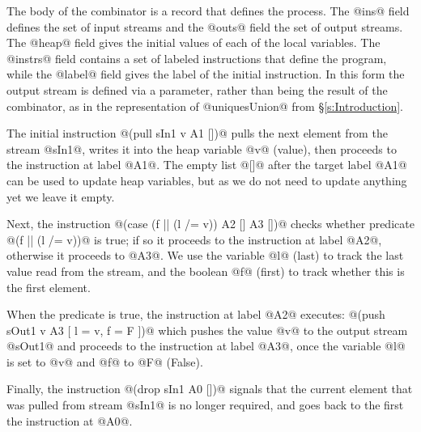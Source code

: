 The body of the combinator is a record that defines the process. The @ins@ field defines the set of input streams and the @outs@ field the set of output streams. The @heap@ field gives the initial values of each of the local variables. The @instrs@ field contains a set of labeled instructions that define the program, while the @label@ field gives the label of the initial instruction. In this form the output stream is defined via a parameter, rather than being the result of the combinator, as in the representation of @uniquesUnion@ from \S\ref{s:Introduction}. 

The initial instruction @(pull sIn1 v A1 [])@ pulls the next element from the stream @sIn1@, writes it into the heap variable @v@ (value), then proceeds to the instruction at label @A1@. The empty list @[]@ after the target label @A1@ can be used to update heap variables, but as we do not need to update anything yet we leave it empty. 

Next, the instruction @(case (f || (l /= v)) A2 [] A3 [])@ checks whether predicate @(f || (l /= v))@ is true; if so it proceeds to the instruction at label @A2@, otherwise it proceeds to @A3@. We use the variable @l@ (last) to track the last value read from the stream, and the boolean @f@ (first) to track whether this is the first element.

When the predicate is true, the instruction at label @A2@ executes:
@(push sOut1 v A3 [ l = v, f = F ])@
which pushes the value @v@ to the output stream @sOut1@ and proceeds to the instruction at label @A3@, once the variable @l@ is set to @v@ and @f@ to @F@ (False).

Finally, the instruction @(drop sIn1 A0 [])@ signals that the current element that was pulled from stream @sIn1@ is no longer required, and goes back to the first the instruction at @A0@. 



